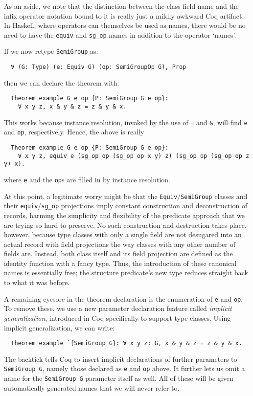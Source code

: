 \documentclass[a4paper,10pt,runningheads]{llncs}
\begin{document}
As an aside, we note that the distinction between the class field name and the infix operator notation bound to it is really just a mildly awkward Coq artifact. In Haskell, where operators can themselves be used as names, there would be no need to have the \lstinline|equiv| and \lstinline|sg_op| names in addition to the operator `names'.

If we now retype \lstinline|SemiGroup| as:
\begin{lstlisting}
  ∀ (G: Type) (e: Equiv G) (op: SemiGroupOp G), Prop
\end{lstlisting}
then we can declare the theorem with:
\begin{lstlisting}
  Theorem example G e op {P: SemiGroup G e op}:
    ∀ x y z, x & y & z = z & y & x.
\end{lstlisting}
This works because instance resolution, invoked by the use of \lstinline|=| and \lstinline|&|, will find \lstinline|e| and \lstinline|op|, respectively. Hence, the above is really

\begin{lstlisting}
  Theorem example G e op {P: SemiGroup G e op}:
    ∀ x y z, equiv e (sg_op op (sg_op op x y) z) (sg_op op (sg_op op z y) x).
\end{lstlisting}
where \lstinline|e| and the \lstinline|op|s are filled in by instance resolution.

At this point, a legitimate worry might be that the \lstinline|Equiv|/\lstinline|SemiGroup| classes and their \lstinline|equiv|/\lstinline|sg_op| projections imply constant construction and deconstruction of records, harming the simplicity and flexibility of the predicate approach that we are trying so hard to preserve. No such construction and destruction takes place, however, because type classes with only a single field are not desugared into an actual record with field projections the way classes with any other number of fields are. Instead, both class itself and its field projection are defined as the identity function with a fancy type. Thus, the introduction of these canonical names is essentially free; the structure predicate's new type reduces straight back to what it was before.

A remaining eyesore in the theorem declaration is the enumeration of \lstinline|e| and \lstinline|op|. To remove these, we use a new parameter declaration feature called \emph{implicit generalization}, introduced in Coq specifically to support type classes. Using implicit generalization, we can write:
\begin{lstlisting}
  Theorem example `{SemiGroup G}: ∀ x y z: G, x & y & z = z & y & x.
\end{lstlisting}
The backtick tells Coq to insert implicit declarations of further parameters to \lstinline|SemiGroup G|, namely those declared as \lstinline|e| and \lstinline|op| above. It further lets us omit a name for the \lstinline|SemiGroup G| parameter itself as well. All of these will be given automatically generated names that we will never refer to.
\end{document}
